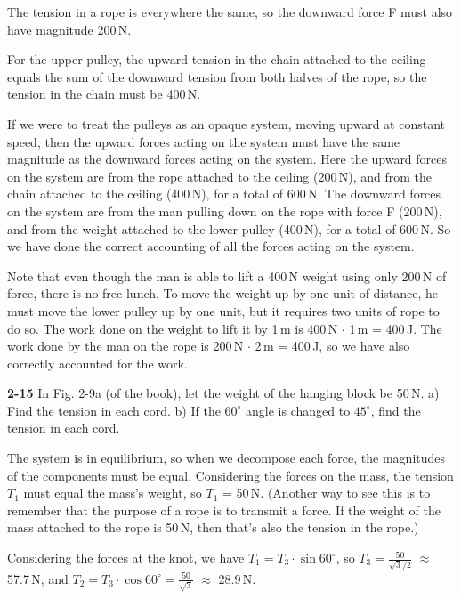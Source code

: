 \documentclass{amsart}
\begin{document}
The tension in a rope is everywhere the same, so the downward force F must also have magnitude 200\,N.

For the upper pulley, the upward tension in the chain attached to the ceiling equals the sum of the downward tension from
both halves of the rope, so the tension in the chain must be 400\,N.

If we were to treat the pulleys as an opaque system, moving upward at constant speed, then the upward
forces acting on the system must have the same magnitude as the downward forces acting on the system.
Here the upward forces on the system are from the rope attached to the ceiling (200\,N),
and from the chain attached to the ceiling (400\,N), for a total of 600\,N.
The downward forces on the system are from the man pulling down on the rope with force F (200\,N),
and from the weight attached to the lower pulley (400\,N), for a total of 600\,N.
So we have done the correct accounting of all the forces acting on the system.

Note that even though the man is able to lift a 400\,N weight using only 200\,N of force,
there is no free lunch.  To move the weight up by one unit of distance, he must move the lower pulley up
by one unit, but it requires two units of rope to do so.
The work done on the weight to lift it by 1\,m is 400\,N $\cdot$ 1\,m = 400\,J.
The work done by the man on the rope is 200\,N $\cdot$ 2\,m = 400\,J,
so we have also correctly accounted for the work.

\vspace{\baselineskip}
\noindent
\textbf{2-15} In Fig. 2-9a (of the book), let the weight of the hanging block be 50\,N.\newline
a) Find the tension in each cord.\newline
b) If the $60^\circ$ angle is changed to $45^\circ$, find the tension in each cord.

The system is in equilibrium, so when we decompose each force, the magnitudes of the components must be equal.
Considering the forces on the mass, the tension $T_1$ must equal the mass's weight, so $T_1$ = 50\,N.
(Another way to see this is to remember that the purpose of a rope is to transmit a force.  
If the weight of the mass attached to the rope is 50\,N, then that's also the tension in the rope.)

Considering the forces at the knot,
we have 
$T_1 = T_3 \cdot \sin 60^\circ$, so $T_3 = \frac{50}{\sqrt{3}/2}$ $\approx$ 57.7\,N,
and $T_2 = T_3 \cdot \cos 60^\circ = \frac{50}{\sqrt{3}}$ $\approx$ 28.9\,N.
\end{document}
